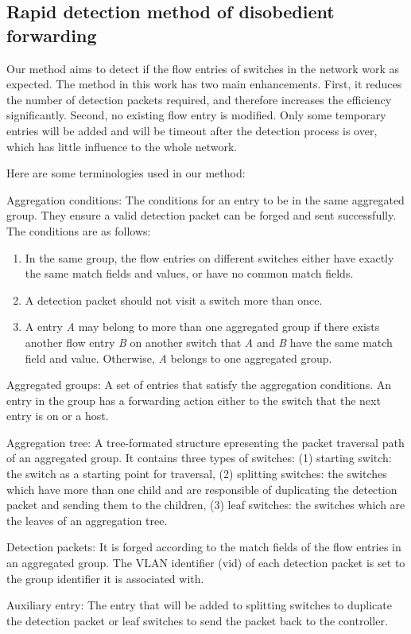 \documentclass[conference]{IEEEtran}
\begin{document}
\subsection{Rapid detection method of disobedient forwarding}
Our method aims to detect if the flow entries of switches in the network work as expected. The method in this work has two main enhancements. First, it reduces the number of detection packets required, and therefore increases the efficiency significantly. Second, no existing flow entry is modified. Only some temporary entries will be added and will be timeout after the detection process is over, which has little influence to the whole network. 

Here are some terminologies used in our method:
\begin{description}
\item
Aggregation conditions: The conditions for an entry to be in the same aggregated group. They ensure a valid detection packet can be forged and sent successfully. The conditions are as follows:
\begin{enumerate}
\item
In the same group, the flow entries on different switches either have exactly the same match fields and values, or have no common match fields.
\item
A detection packet should not visit a switch more than once.
\item
A entry \textit{A} may belong to more than one aggregated group if there exists another flow entry \textit{B} on another switch that \textit{A} and \textit{B} have the same match field and value. Otherwise, \textit{A} belongs to one aggregated group.
\end{enumerate}

\item
Aggregated groups: A set of entries that satisfy the aggregation conditions. An entry in the group has a forwarding action either to the switch that the next entry is on or a host.

\item 
Aggregation tree: A tree-formated structure epresenting the packet traversal path of an aggregated group. It contains three types of switches: (1) starting switch: the switch as a starting point for traversal, (2) splitting switches: the switches which have more than one child and are responsible of duplicating the detection packet and sending them to the children, (3) leaf switches: the switches which are the leaves of an aggregation tree.

\item
Detection packets: It is forged according to the match fields of the flow entries in an aggregated group. The VLAN identifier (vid) of each detection packet is set to the group identifier it is associated with.

\item 
Auxiliary entry: The entry that will be added to splitting switches to duplicate the detection packet or leaf switches to send the packet back to the controller.
\end{description}
\end{document}
